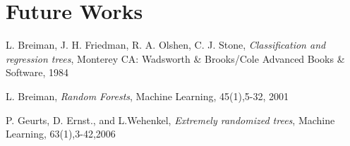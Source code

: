 \documentclass[10pt]{report}
\begin{document}
\chapter{Future Works}


\begin{thebibliography}{9}

L. Breiman, J. H. Friedman, R. A. Olshen, C. J. Stone, \textit{Classification and regression trees}, Monterey CA: Wadsworth & Brooks/Cole Advanced Books & Software, 1984

L. Breiman, \textit{Random Forests}, Machine Learning, 45(1),5-32, 2001

P. Geurts, D. Ernst., and L.Wehenkel, \textit{Extremely randomized trees}, Machine Learning, 63(1),3-42,2006

\end{thebibliography}


\printglossary[type=\acronymtype]
\printglossary
\end{document}
